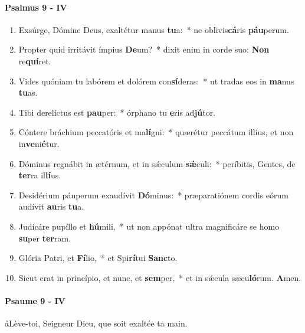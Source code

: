 \documentclass[twoside]{article}
\begin{document}
\begin{paracol}[1]{2}
\switchcolumn*

\paragraph{Psalmus 9 - IV}


\begin{enumerate}[wide, itemsep=0mm, labelwidth=!, labelindent=0pt, label=\color{gregoriocolor}\theenumi]
\item Exsúrge, Dómine Deus, exaltétur manus \textbf{tu}a:~* ne oblivis\textbf{cá}ris \textbf{páu}perum.
\item Propter quid irritávit ímpius \textbf{De}um?~* dixit enim in corde suo: \textbf{Non} re\textbf{quí}ret.
\item Vides quóniam tu labórem et dolórem con\textbf{sí}deras:~* ut tradas eos in \textbf{ma}nus \textbf{tu}as.
\item Tibi derelíctus est \textbf{pau}per:~* órphano tu \textbf{e}ris ad\textbf{jú}tor.
\item Cóntere bráchium peccatóris et ma\textbf{lí}gni:~* quærétur peccátum illíus, et non in\textbf{ve}ni\textbf{é}tur.
\item Dóminus regnábit in ætérnum, et in sǽculum \textbf{sǽ}culi:~* períbitis, Gentes, de \textbf{ter}ra il\textbf{lí}us.
\item Desidérium páuperum exaudívit \textbf{Dó}minus:~* præparatiónem cordis eórum audívit \textbf{au}ris \textbf{tu}a.
\item Judicáre pupíllo et \textbf{hú}mili,~* ut non appónat ultra magnificáre se homo \textbf{su}per \textbf{ter}ram.
\item Glória Patri, et \textbf{Fí}lio,~* et Spi\textbf{rí}tui \textbf{Sanc}to.
\item Sicut erat in princípio, et nunc, et \textbf{sem}per,~* et in sǽcula sæcu\textbf{ló}rum. \textbf{A}men.
\end{enumerate}

\switchcolumn

\paragraph{Psaume 9 - IV}
\aa Lève-toi, Seigneur Dieu, que soit exaltée ta main.



\end{paracol}
\end{document}
